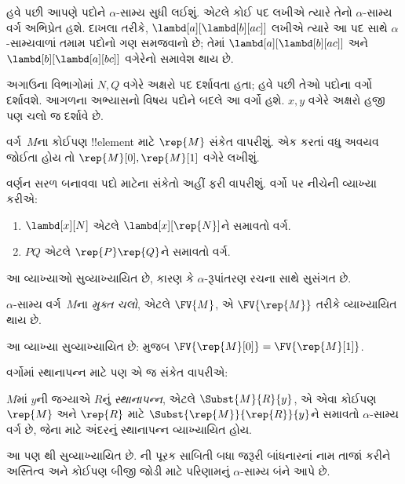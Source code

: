 \documentclass[../../../include/open-logic-section]{subfiles}
\begin{document}

હવે પછી આપણે પદોને $\alpha$-સામ્ય સુધી લઈશું. એટલે કોઈ પદ
લખીએ ત્યારે તેનો $\alpha$-સામ્ય વર્ગ અભિપ્રેત હશે. દાખલા તરીકે,
$\lambd[a][\lambd[b][a c]]$ લખીએ ત્યારે આ પદ સાથે
$\alpha$-સામ્યવાળાં તમામ પદોનો ગણ સમજવાનો છે; તેમાં
$\lambd[a][\lambd[b][a c]]$ અને
$\lambd[b][\lambd[a][b c]]$ વગેરેનો સમાવેશ થાય છે.

અગાઉના વિભાગોમાં $N, Q$ વગેરે અક્ષરો પદ દર્શાવતા હતા;
હવે પછી તેઓ પદોના વર્ગો દર્શાવશે. આગળના અભ્યાસનો વિષય
પદોને બદલે આ વર્ગો હશે. $x, y$ વગેરે અક્ષરો હજી પણ
ચલો જ દર્શાવે છે.

વર્ગ~$M$ના કોઈપણ !!{element} માટે $\rep{M}$ સંકેત વાપરીશું.
એક કરતાં વધુ અવયવ જોઈતા હોય તો $\rep{M}[0], \rep{M}[1]$
વગેરે લખીશું.

વર્ણન સરળ બનાવવા પદો માટેના સંકેતો અહીં ફરી વાપરીશું.
વર્ગો પર નીચેની વ્યાખ્યા કરીએ:
\begin{defn}
  \begin{enumerate}
  \item $\lambd[x][N]$ એટલે $\lambd[x][\rep{N}]$ને
    સમાવતો વર્ગ.
  \item $PQ$ એટલે $\rep{P}\rep{Q}$ને સમાવતો વર્ગ.
  \end{enumerate}
\end{defn}

આ વ્યાખ્યાઓ સુવ્યાખ્યાયિત છે, કારણ કે $\alpha$-રૂપાંતરણ
રચના સાથે સુસંગત છે.

\begin{defn} 
  $\alpha$-સામ્ય વર્ગ~$M$ના \emph{મુક્ત ચલો}, એટલે
  $\FV{M}$, એ $\FV{\rep{M}}$ તરીકે વ્યાખ્યાયિત થાય છે.
\end{defn}

આ વ્યાખ્યા સુવ્યાખ્યાયિત છે:  મુજબ
$\FV{\rep{M}[0]} = \FV{\rep{M}[1]}$.

વર્ગોમાં સ્થાનાપન્ન માટે પણ એ જ સંકેત વાપરીએ:
\begin{defn} 
  $M$માં $y$ની જગ્યાએ $R$નું \emph{સ્થાનાપન્ન}, એટલે
  $\Subst{M}{R}{y}$, એ એવા કોઈપણ $\rep{M}$ અને
  $\rep{R}$ માટે $\Subst{\rep{M}}{\rep{R}}{y}$ને
  સમાવતો $\alpha$-સામ્ય વર્ગ છે, જેના માટે અંદરનું
  સ્થાનાપન્ન વ્યાખ્યાયિત હોય.
\end{defn}

આ પણ થી સુવ્યાખ્યાયિત છે.
ની પૂરક સાબિતી બધા જરૂરી બાંધનારનાં
નામ તાજાં કરીને અસ્તિત્વ અને કોઈપણ બીજી જોડી માટે
પરિણામનું $\alpha$-સામ્ય બંને આપે છે.
\end{document}

